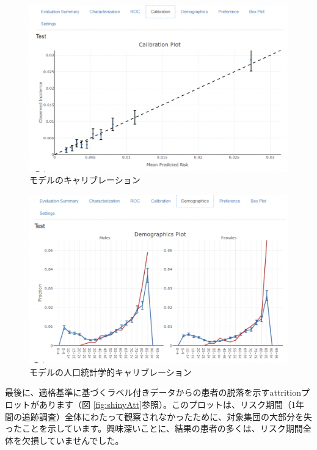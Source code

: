 \documentclass[
  11pt]{book}
\theoremstyle{definition}
\theoremstyle{definition}
\theoremstyle{definition}
\theoremstyle{definition}
\theoremstyle{remark}
\begin{document}
\begin{figure}

{\centering \includegraphics[width=1\linewidth]{images/PatientLevelPrediction/shiny/singleShiny/singleShinyCal} 

}

\caption{モデルのキャリブレーション}\label{fig:shinyCal}
\end{figure}

\begin{figure}

{\centering \includegraphics[width=1\linewidth]{images/PatientLevelPrediction/shiny/singleShiny/singleShinyDemo} 

}

\caption{モデルの人口統計学的キャリブレーション}\label{fig:shinyDemo}
\end{figure}

最後に、適格基準に基づくラベル付きデータからの患者の脱落を示すattritionプロットがあります（図 \ref{fig:shinyAtt}参照）。このプロットは、リスク期間（1年間の追跡調査）全体にわたって観察されなかったために、対象集団の大部分を失ったことを示しています。興味深いことに、結果の患者の多くは、リスク期間全体を欠損していませんでした。
\end{document}
